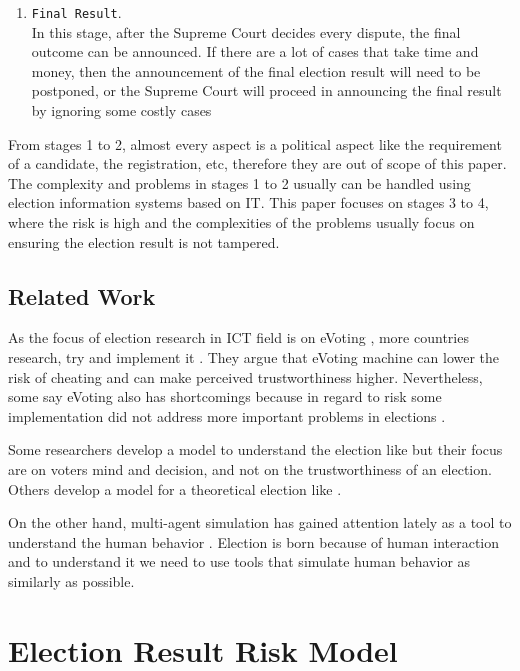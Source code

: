 \documentclass[JIP]{ipsj}
\def\|{\verb|}
\begin{document}
\begin{enumerate}
\item \|Final Result|.\\
In this stage, after the Supreme Court decides every dispute, the final outcome can be announced. If there are a lot of cases that take time and money, then the announcement of the final election result will need to be postponed, or the Supreme Court will proceed in announcing the final result by ignoring some costly cases
\end{enumerate}%


From stages 1 to 2, almost every aspect is a political aspect like the requirement of a candidate, the registration, etc, therefore they are out of scope of this paper. The complexity and problems in stages 1 to 2 usually can be handled using election information systems based on IT. This paper focuses on stages 3 to 4, where the risk is high and the complexities of the problems usually focus on ensuring the election result is not tampered.


\subsection{Related Work}%

As the focus of election research in ICT field is on eVoting \cite{Bryans2006}\cite{Volkamer2007}\cite{Mercuri2004}\cite{Kremer2005}, more countries research, try and implement it \cite{Tiresias20121212}. They argue that eVoting machine can lower the risk of cheating and can make perceived trustworthiness higher. Nevertheless, some say eVoting also has shortcomings \cite{ Hisamitsu2007}\cite{ Schryen2009} because in regard to risk some implementation did not address more important problems in elections \cite{ Wolchok2010}.

Some researchers develop a model to understand the election like \cite{ Yoneyama2007} but their focus are on voters mind and decision, and not on the trustworthiness of an election. Others develop a model for a theoretical election like \cite{ Rivest2008}\cite{ Langer2009}\cite{ Ryan2009}.

On the other hand, multi-agent simulation has gained attention lately as a tool to understand the human behavior \cite{ Drogoul2013}. Election is born because of human interaction and to understand it we need to use tools that simulate human behavior as similarly as possible.



\section{Election Result Risk Model}
\end{document}
